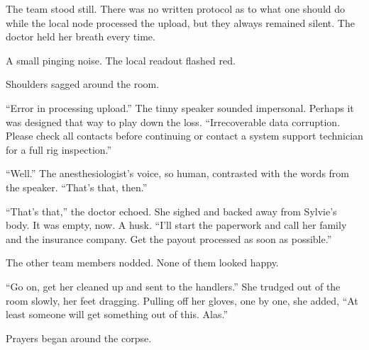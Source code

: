 \noindent The team stood still. There was no written protocol as to what one should do while the local node processed the upload, but they always remained silent. The doctor held her breath every time.

A small pinging noise. The local readout flashed red.

Shoulders sagged around the room.

``Error in processing upload.'' The tinny speaker sounded impersonal. Perhaps it was designed that way to play down the loss. ``Irrecoverable data corruption. Please check all contacts before continuing or contact a system support technician for a full rig inspection.''

``Well.'' The anesthesiologist's voice, so human, contrasted with the words from the speaker. ``That's that, then.''

``That's that,'' the doctor echoed. She sighed and backed away from Sylvie's body. It was empty, now. A husk. ``I'll start the paperwork and call her family and the insurance company. Get the payout processed as soon as possible.''

The other team members nodded. None of them looked happy.

``Go on, get her cleaned up and sent to the handlers.'' She trudged out of the room slowly, her feet dragging. Pulling off her gloves, one by one, she added, ``At least someone will get something out of this. Alas.''

Prayers began around the corpse.
